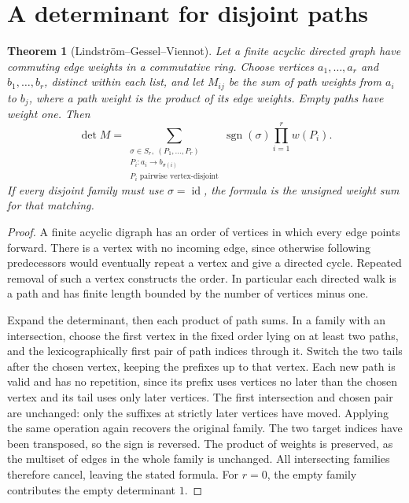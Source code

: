 \documentclass[11pt,oneside,openany]{book}
\theoremstyle{plain}
\newtheorem{theorem}{Theorem}[chapter]
\theoremstyle{definition}
\theoremstyle{remark}
\begin{document}
\section{A determinant for disjoint paths}

\begin{theorem}[Lindström--Gessel--Viennot]\label{p204:W23}
Let a finite acyclic directed graph have commuting edge weights
in a commutative ring. Choose vertices
\(a_1,\ldots,a_r\) and \(b_1,\ldots,b_r\), distinct within
each list, and let \(M_{ij}\) be the sum of path weights from
\(a_i\) to \(b_j\), where a path weight is the product of its edge
weights. Empty paths have weight one. Then
\[
 \det M
 =\sum_{\substack{\sigma\in S_r,\ (P_1,\ldots,P_r)\\
                  P_i:a_i\to b_{\sigma(i)}\\
                  P_i\text{ pairwise vertex-disjoint}}}
          \operatorname{sgn}(\sigma)\prod_{i=1}^r w(P_i).
\]
If every disjoint family must use \(\sigma=\operatorname{id}\),
the formula is the unsigned weight sum for that matching.
\end{theorem}
\begin{proof}
A finite acyclic digraph has an order of vertices in which every
edge points forward. There is a vertex with no incoming edge,
since otherwise following predecessors would eventually repeat
a vertex and give a directed cycle. Repeated removal of such
a vertex constructs the order. In particular each directed
walk is a path and has finite length bounded by the number of
vertices minus one.

Expand the determinant, then each product of path sums. In a
family with an intersection, choose the first vertex in the
fixed order lying on at least two paths, and the lexicographically
first pair of path indices through it. Switch the two tails
after the chosen vertex, keeping the prefixes up to that vertex.
Each new path is valid and has no repetition, since its prefix
uses vertices no later than the chosen vertex and its tail
uses only later vertices. The first intersection and chosen
pair are unchanged: only the suffixes at strictly later vertices
have moved. Applying the same operation again recovers the
original family. The two target indices have been transposed,
so the sign is reversed. The product of weights is preserved,
as the multiset of edges in the whole family is unchanged.
All intersecting families therefore cancel, leaving the stated
formula. For \(r=0\), the empty family contributes the empty
determinant \(1\).
\end{proof}
\end{document}

